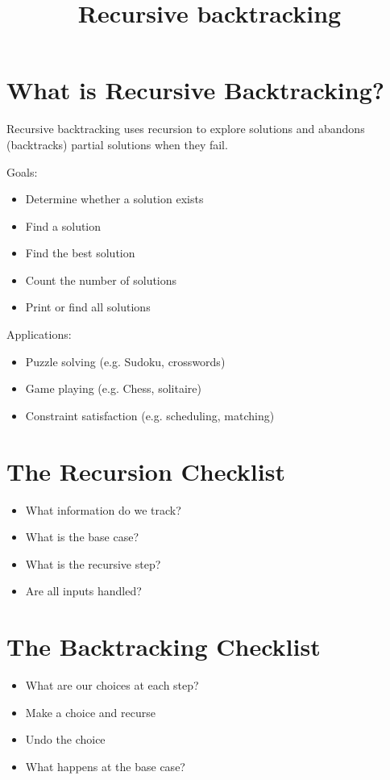 \documentclass{article}
\title{Recursive backtracking}
\author{}
\date{}
\begin{document}
\maketitle



\section{What is Recursive Backtracking?}
Recursive backtracking uses recursion to explore solutions and abandons (backtracks) partial solutions when they fail.

Goals:
\begin{itemize}
  \item Determine whether a solution exists
  \item Find a solution
  \item Find the best solution
  \item Count the number of solutions
  \item Print or find all solutions
\end{itemize}

Applications:
\begin{itemize}
  \item Puzzle solving (e.g. Sudoku, crosswords)
  \item Game playing (e.g. Chess, solitaire)
  \item Constraint satisfaction (e.g. scheduling, matching)
\end{itemize}

\section{The Recursion Checklist}
\begin{itemize}
  \item What information do we track?
  \item What is the base case?
  \item What is the recursive step?
  \item Are all inputs handled?
\end{itemize}

\section{The Backtracking Checklist}
\begin{itemize}
  \item What are our choices at each step?
  \item Make a choice and recurse
  \item Undo the choice
  \item What happens at the base case?
\end{itemize}
\end{document}

